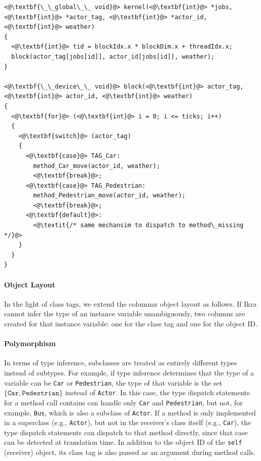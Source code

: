 \documentclass[preprint]{sigplanconf}
\begin{document}
\lstset{language=C++}
\begin{lstlisting}
<@\textbf{\_\_global\_\_ void}@> kernel(<@\textbf{int}@> *jobs, <@\textbf{int}@> *actor_tag, <@\textbf{int}@> *actor_id, <@\textbf{int}@> weather)
{
  <@\textbf{int}@> tid = blockIdx.x * blockDim.x + threadIdx.x;
  block(actor_tag[jobs[id]], actor_id[jobs[id]], weather);
}

<@\textbf{\_\_device\_\_ void}@> block(<@\textbf{int}@> actor_tag, <@\textbf{int}@> actor_id, <@\textbf{int}@> weather)
{
  <@\textbf{for}@> (<@\textbf{int}@> i = 0; i <= ticks; i++)
  {
    <@\textbf{switch}@> (actor_tag)
    {
      <@\textbf{case}@> TAG_Car:
        method_Car_move(actor_id, weather);
        <@\textbf{break}@>;
      <@\textbf{case}@> TAG_Pedestrian:
        method_Pedestrian_move(actor_id, weather);
        <@\textbf{break}@>;
      <@\textbf{default}@>:
        <@\textit{/* same mechansim to dispatch to method\_missing */}@>
    }
  }
}
\end{lstlisting}

\paragraph{Object Layout}
In the light of class tags, we extend the columnar object layout as follows. If Ikra cannot infer the type of an instance variable unambiguously, two columns are created for that instance variable: one for the class tag and one for the object ID.

\paragraph{Polymorphism}
In terms of type inference, subclasses are treated as entirely different types instead of subtypes. For example, if type inference determines that the type of a variable can be \texttt{Car} or \texttt{Pedestrian}, the type of that variable is the set $\{\texttt{Car}, \texttt{Pedestrian}\}$ instead of \texttt{Actor}. In this case, the type dispatch statements for a method call contains can handle only \texttt{Car} and \texttt{Pedestrian}, but not, for example, \texttt{Bus}, which is also a subclass of \texttt{Actor}. If a method is only implemented in a superclass (e.g., \texttt{Actor}), but not in the receiver's class itself (e.g., \texttt{Car}), the type dispatch statements can dispatch to that method directly, since that case can be detected at translation time. In addition to the object ID of the \texttt{self} (receiver) object, its class tag is also passed as an argument during method calls.
\end{document}
